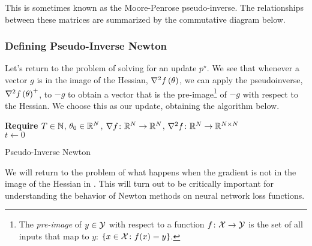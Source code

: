 \documentclass[../../thesis.tex]{subfiles}
\begin{document}
This is sometimes known as the Moore-Penrose pseudo-inverse.
The relationships between these matrices
are summarized by the commutative diagram below.
\begin{center}
\end{center}


\subsubsection{Defining Pseudo-Inverse Newton}

Let's return to the problem of solving
for an update $p^{\star}$.
We see that whenever a vector $g$
is in the image of the Hessian, $\nabla^2f\left(\theta\right)$,
we can apply the pseudoinverse, $\nabla^2f\left(\theta\right)^{+}$,
to $-g$ to obtain a vector that is the pre-image\footnote{%
	The \emph{pre-image} of $y\in{\mathcal{Y}}$
	with respect to a function
	$f\colon{\mathcal{X}}\to{\mathcal{Y}}$
	is the set of all inputs that map to $y$:
	$\left\{x\in{\mathcal{X}} \colon f(x) = y\right\}$.
} of $-g$
with respect to the Hessian.
We choose this as our update,
obtaining the algorithm below.
\\
\begin{algorithm}[H]
    \SetAlgoLined{}
    \textbf{Require}
    $T\in \mathbb{N}$, $\theta_0 \in \mathbb{R}^N$,
    $\nabla{f}\colon\mathbb{R}^N\to\mathbb{R}^N$,
    $\nabla^2{f}\colon\mathbb{R}^N\to\mathbb{R}^{N\times N}$\\
    $t \leftarrow 0$\\
    \caption{Pseudo-Inverse Newton}
\end{algorithm}

We will return to the problem of what happens
when the gradient is not in the image of the Hessian in .
This will turn out to be critically important for understanding
the behavior of Newton methods on neural network loss functions.
\end{document}
